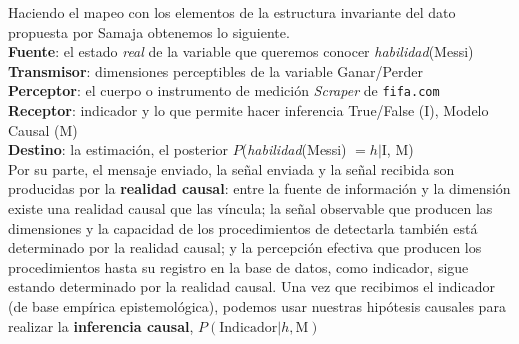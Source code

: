 \documentclass[a4paper,11pt]{book}
\theoremstyle{definition}
\begin{document}

Haciendo el mapeo con los elementos de la estructura invariante del dato propuesta por Samaja obtenemos lo siguiente. \\[0.1cm]
\noindent \textbf{Fuente}: el estado \textit{real} de la variable que  queremos conocer \hfill
\textit{habilidad}(Messi)\\
\textbf{Transmisor}: dimensiones perceptibles de la variable \hfill
Ganar/Perder\\
\textbf{Perceptor}: el cuerpo o instrumento de medici\'on \hfill
\textit{Scraper} de \texttt{fifa.com}  \\
\textbf{Receptor}: indicador y lo que permite hacer inferencia \hfill
True/False (I), Modelo Causal (M)\\
\textbf{Destino}: la estimaci\'on, el posterior   \hfill
$P$(\textit{habilidad}(Messi) $= h|$I, M) \\


Por su parte, el mensaje enviado, la se\~nal enviada y la se\~nal recibida son producidas por la \textbf{realidad causal}:
%
entre la fuente de informaci\'on y la dimensi\'on existe una realidad causal que las v\'incula;
%
la se\~nal observable que producen las dimensiones y la capacidad de los procedimientos de detectarla tambi\'en est\'a determinado por la realidad causal;
%
y la percepci\'on efectiva que producen los procedimientos hasta su registro en la base de datos, como indicador, sigue estando determinado por la realidad causal.
%
Una vez que recibimos el indicador (de base emp\'irica epistemol\'ogica), podemos usar nuestras hip\'otesis causales para realizar la \textbf{inferencia causal}, $P(\text{Indicador}|h, \text{M})$ \\

\end{document}
